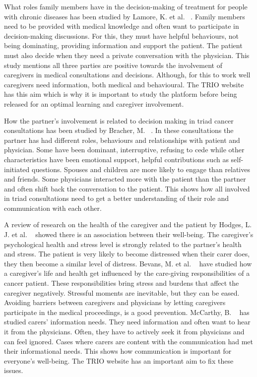 \documentclass{sigchi}
\begin{document}
What roles family members have in the decision-making of treatment for people with chronic diseases has been studied by Lamore, K. et al. ~\cite{Lamore2017}. Family members need to be provided with medical knowledge and often want to participate in decision-making discussions. For this, they must have helpful behaviours, not being dominating, providing information and support the patient. The patient must also decide when they need a private conversation with the physician. This study mentions all three parties are positive towards the involvement of caregivers in medical consultations and decisions. Although, for this to work well caregivers need information, both medical and behavioural. The TRIO website has this aim which is why it is important to study the platform before being released for an optimal learning and caregiver involvement. 

How the partner’s involvement is related to decision making in triad cancer consultations has been studied by Bracher, M. ~\cite{Bracher2019}. In these consultations the partner has had different roles, behaviours and relationships with patient and physician. Some have been dominant, interruptive, refusing to cede while other characteristics have been emotional support, helpful contributions such as self-initiated questions. Spouses and children are more likely to engage than relatives and friends. Some physicians interacted more with the patient than the partner and often shift back the conversation to the patient. This shows how all involved in triad consultations need to get a better understanding of their role and communication with each other.

A review of research on the health of the caregiver and the patient by Hodges, L. J. et al. ~\cite{Hodges2005} showed there is an association between their well-being. The caregiver’s psychological health and stress level is strongly related to the partner’s health and stress. The patient is very likely to become distressed when their carer does, they then become a similar level of distress. Bevans, M. et al. ~\cite{Bevans2012} have studied how a caregiver’s life and health get influenced by the care-giving responsibilities of a cancer patient. These responsibilities bring stress and burdens that affect the caregiver negatively. Stressful moments are inevitable, but they can be eased. Avoiding barriers between caregivers and physicians by letting caregivers participate in the medical proceedings, is a good prevention. McCarthy, B. ~\cite{McCarthy2011} has studied carers’ information needs. They need information and often want to hear it from the physicians. Often, they have to actively seek it from physicians and can feel ignored. Cases where carers are content with the communication had met their informational needs. This shows how communication is important for everyone’s well-being. The TRIO website has an important aim to fix these issues.  
\end{document}

